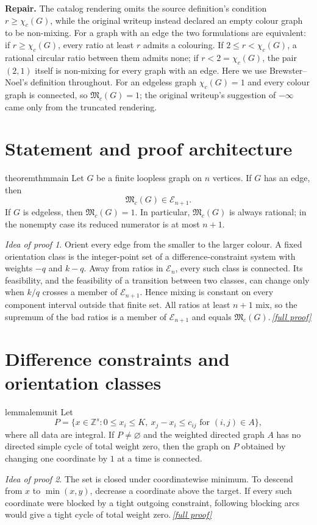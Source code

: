 \documentclass[11pt,a4paper]{article}
\theoremstyle{plain}
\theoremstyle{definition}
\theoremstyle{remark}
\newtheorem*{proofidea}{Idea of proof}
\newcommand{\fullproofref}[1]{\,\hyperref[#1]{\textit{[full proof]}}}
\newcommand{\Z}{\mathbb Z}
\newcommand{\Mc}{\mathfrak M_c}
\newcommand{\cE}{\mathcal E}
\newcommand{\chic}{\chi_c}
\newcommand{\repair}[1]{\begin{tcolorbox}[colback=yellow!7,colframe=gray!60,boxrule=0.3pt,arc=1pt,left=5pt,right=5pt,top=3pt,bottom=3pt]\small\textbf{Repair.} #1\end{tcolorbox}}
\begin{document}
\repair{The catalog rendering omits the source definition's condition
$r\ge\chic(G)$, while the original writeup instead declared an empty colour graph to
be non-mixing.  For a graph with an edge the two formulations are equivalent: if
$r\ge\chic(G)$, every ratio at least $r$ admits a colouring.  If $2\le r<\chic(G)$,
a rational circular ratio between them admits none; if $r<2=\chic(G)$, the pair
$(2,1)$ itself is non-mixing for every graph with an edge.  Here we use
Brewster--Noel's definition throughout.
For an edgeless graph $\chic(G)=1$ and every colour graph is connected, so $\Mc(G)=1$;
the original writeup's suggestion of $-\infty$ came only from the truncated rendering.}

\section{Statement and proof architecture}

\begin{restatable}{theorem}{thmmain}\label{thm:main}
Let $G$ be a finite loopless graph on $n$ vertices.  If $G$ has an edge, then
\[
 \Mc(G)\in\cE_{n+1}.
\]
If $G$ is edgeless, then $\Mc(G)=1$.  In particular, $\Mc(G)$ is always rational; in
the nonempty case its reduced numerator is at most $n+1$.
\end{restatable}
\begin{proofidea}
Orient every edge from the smaller to the larger colour.  A fixed orientation class is
the integer-point set of a difference-constraint system with weights $-q$ and $k-q$.
Away from ratios in $\cE_n$, every such class is connected.  Its feasibility, and the
feasibility of a transition between two classes, can change only when $k/q$ crosses a
member of $\cE_{n+1}$.  Hence mixing is constant on every component interval outside
that finite set.  All ratios at least $n+1$ mix, so the supremum of the bad ratios is a
member of $\cE_{n+1}$ and equals $\Mc(G)$.\fullproofref{pf:main}
\end{proofidea}

\section{Difference constraints and orientation classes}

\begin{restatable}{lemma}{lemunit}\label{lem:unit}
Let
\[
 P=\{x\in\Z^s:0\le x_i\le K,\ x_j-x_i\le c_{ij}\text{ for }(i,j)\in A\},
\]
where all data are integral.  If $P\ne\varnothing$ and the weighted directed graph
$A$ has no directed simple cycle of total weight zero, then the graph on $P$ obtained
by changing one coordinate by $1$ at a time is connected.
\end{restatable}
\begin{proofidea}
The set is closed under coordinatewise minimum.  To descend from $x$ to
$\min(x,y)$, decrease a coordinate above the target.  If every such coordinate were
blocked by a tight outgoing constraint, following blocking arcs would give a tight
cycle of total weight zero.\fullproofref{pf:unit}
\end{proofidea}
\end{document}
